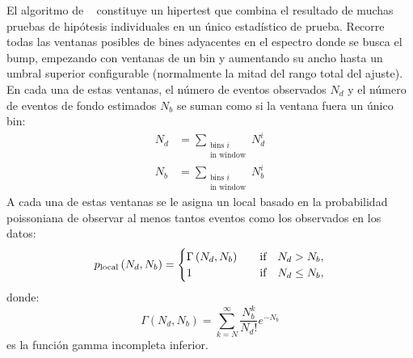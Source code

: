 El algoritmo de \bh~\cite{BumpHunter,pyBumpHunter} constituye un hipertest que combina el resultado de muchas pruebas de hipótesis individuales en un único estadístico de prueba. Recorre todas las ventanas posibles de bines adyacentes en el espectro donde se busca el bump, empezando con ventanas de un bin y aumentando su ancho hasta un umbral superior configurable (normalmente la mitad del rango total del ajuste). En cada una de estas ventanas, el número de eventos observados \(N_d\) y el n\'umero de eventos de fondo estimados \(N_b\) se suman como si la ventana fuera un único bin:
\begin{align}
    N_d &= \sum_{ \substack{ \text{bins \(i\)} \\ \text{in window} } } N_d^i\\
    N_b &= \sum_{ \substack{ \text{bins \(i\)} \\ \text{in window} } } N_b^i
\end{align}
A cada una de estas ventanas se le asigna un \pval local basado en la probabilidad poissoniana de observar al menos tantos eventos como los observados en los datos:
\begin{equation}
    p_{\text{local}} \left(N_d, N_b\right) = 
    \begin{cases}
        \Gamma \left(N_d, N_b\right)    &\qif   N_d > N_b,\\
        1                               &\qif   N_d \leq N_b,
    \end{cases}
\end{equation}
donde:
\begin{equation}
    \Gamma \left(N_d, N_b\right) = \sum_{k=N}^{\infty} \frac{N_b^k}{N_d!} e^{-N_b}
\end{equation}
es la función gamma incompleta inferior.

